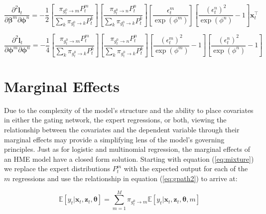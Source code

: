 \documentclass[12pt]{article}
\newcommand{\gateprod}[2]{\pi_{#1 \longrightarrow #2}}
\theoremstyle{definition}
\begin{document}
\begin{equation} 
  \frac{\partial^{2} \boldsymbol{l}_{t}}{\partial \boldsymbol{\beta}^{m} \partial \boldsymbol{\phi}^{n} } = - \frac{1}{2}  \left[ \frac{\gateprod{g^{0}_{t}}{m} P^{m}_{t}}{ \sum_{k} \gateprod{g^{0}_{t}}{k} P^{k}_{t}} \right] \left[ \frac{\gateprod{g^{0}_{t}}{n} P^{n}_{t}}{ \sum_{k} \gateprod{g^{0}_{t}}{k} P^{k}_{t}} \right]  \left[ \frac{\epsilon^{m}_{t}}{\exp(\phi^{m})} \right] \left[  \frac{ (\epsilon^{n}_{t})^{2} }{\exp(\phi^{n})} - 1 \right] \boldsymbol{x}_{t}^{\top} 
\end{equation}

\begin{equation} 
  \frac{\partial^{2} \boldsymbol{l}_{t}}{\partial \boldsymbol{\phi}^{m} \partial \boldsymbol{\phi}^{n} } =  -\frac{1}{4} \left[ \frac{\gateprod{g^{0}_{t}}{m} P^{m}_{t}}{ \sum_{k} \gateprod{g^{0}_{t}}{k} P^{k}_{t}} \right] \left[ \frac{\gateprod{g^{0}_{t}}{n} P^{n}_{t}}{ \sum_{k} \gateprod{g^{0}_{t}}{k} P^{k}_{t}} \right]  \left[ \frac{ (\epsilon^{m}_{t})^{2} }{\exp(\phi^{m})} - 1 \right] \left[ \frac{ (\epsilon^{n}_{t})^{2} }{\exp(\phi^{n})} - 1 \right] 
\end{equation}


\section{Marginal Effects} \label{sec:MarginalEffects}

Due to the complexity of the model's structure and the ability to place covariates in either the gating network, the expert regressions, or both, viewing the relationship between the covariates and the dependent variable through their marginal effects may provide a simplifying lens of the model's governing principles. Just as for logistic and multinomial regression, the marginal effects of an HME model have a closed form solution. Starting with equation (\ref{eq:mixture}) we replace the expert distributions $P^{m}_{t}$ with the expected output for each of the $m$ regressions and use the relationship in equation (\ref{eq:gpath2}) to arrive at: 

\begin{equation} \label{eq:mixture2}
  \mathbb{E} \left[ y_{t} | \boldsymbol{x}_{t}, \boldsymbol{z}_{t}, \boldsymbol{\theta} \right] = \sum_{m=1}^{M} \gateprod{g^{0}_{t}}{m} \mathbb{E} \left[ y_{t} | \boldsymbol{x}_{t}, \boldsymbol{z}_{t}, \boldsymbol{\theta}, m \right]
\end{equation}
\end{document}
